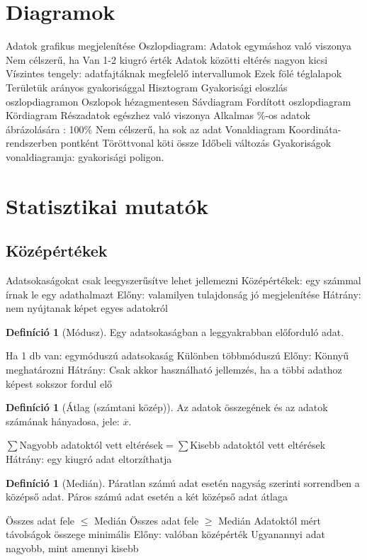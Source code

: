 \documentclass[twoside,12pt]{report}
\theoremstyle{definition}
\newtheorem{definition}[theorem]{Definíció}
\begin{document}
\section{Diagramok}
	\begin{outline}
		\1 Adatok grafikus megjelenítése
		\1 Oszlopdiagram:
			\2 Adatok egymáshoz való viszonya
			\2 Nem célszerű, ha
				\3 Van 1-2 kiugró érték
				\3 Adatok közötti eltérés nagyon kicsi
			\2 Víszintes tengely: adatfajtáknak megfelelő intervallumok
				\3 Ezek fölé téglalapok
				\3 Területük arányos gyakorisággal
		\1 Hisztogram
			\2 Gyakorisági eloszlás oszlopdiagramon
			\2 Oszlopok hézagmentesen
		\1 Sávdiagram
			\2 Fordított oszlopdiagram
		\1 Kördiagram
			\2 Részadatok egészhez való viszonya
			\2 Alkalmas \%-os adatok ábrázolására
				\degree: 100\%
			\2 Nem célszerű, ha sok az adat
		\1 Vonaldiagram
			\2 Koordináta-rendszerben pontként
			\2 Töröttvonal köti össze
			\2 Időbeli változás
			\2 Gyakoriságok vonaldiagramja: gyakorisági poligon.
	\end{outline}
\section{Statisztikai mutatók}
	\subsection{Középértékek}
	\begin{outline}
		\1 Adatsokaságokat csak leegyszerűsítve lehet jellemezni
			\2 Középértékek: egy számmal írnak le egy adathalmazt
			\2 Előny: valamilyen tulajdonság jó megjelenítése
			\2 Hátrány: nem nyújtanak képet egyes adatokról
	\end{outline}
\pagebreak
	\begin{outline}
		\1[] \begin{definition}[Módusz]
				Egy adatsokaságban a leggyakrabban előforduló adat.
			\end{definition}
			\2 Ha 1 db van: egymóduszú adatsokaság
				\3 Különben többmóduszú
			\2 Előny: Könnyű meghatározni
			\2 Hátrány: Csak akkor használható jellemzés, ha a többi adathoz képest sokszor fordul elő
		\1[] \begin{definition}[Átlag (számtani közép)]
				Az adatok összegének és az adatok számának hányadosa, jele: $\overline{x}$.
			\end{definition}
			\2 $\sum$Nagyobb adatoktól vett eltérések$=\sum$Kisebb adatoktól vett eltérések
			\2 Hátrány: egy kiugró adat eltorzíthatja
		\1[] \begin{definition}[Medián]
			Páratlan számú adat esetén nagyság szerinti sorrendben a középső adat. Páros számú adat esetén a két középső adat átlaga
		\end{definition}
			\2 Összes adat fele $\le$ Medián
			\2 Összes adat fele $\ge$ Medián
			\2 Adatoktól mért távolságok összege minimális
			\2 Előny: valóban középérték
				\3 Ugyanannyi adat nagyobb, mint amennyi kisebb
	\end{outline}
\end{document}
